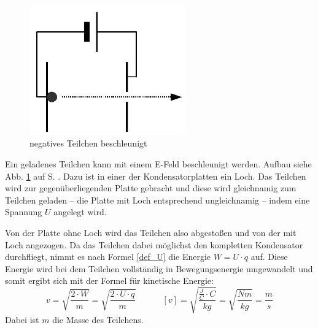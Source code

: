 		\begin{figure}
		\centering
		\includegraphics[width=0.6\textwidth]{mat/beschleunigung}
		\caption{negatives Teilchen beschleunigt}
		\label{img_beschleunigung}
		\end{figure}
Ein geladenes Teilchen kann mit einem E-Feld beschleunigt werden. Aufbau siehe Abb. \ref{img_beschleunigung} auf S. \pageref{img_beschleunigung}. Dazu ist in einer der Kondensatorplatten ein Loch. Das Teilchen wird zur gegenüberliegenden Platte gebracht und diese wird gleichnamig zum Teilchen geladen -- die Platte mit Loch entsprechend ungleichnamig -- indem eine Spannung \(U\) angelegt wird.

Von der Platte ohne Loch wird das Teilchen also abgestoßen und von der mit Loch angezogen. Da das Teilchen dabei möglichst den kompletten Kondensator durchfliegt, nimmt es nach Formel \ref{def_U} die Energie \(W = U \cdot q \) auf. Diese Energie wird bei dem Teilchen vollständig in Bewegungsenergie umgewandelt und somit ergibt sich mit der Formel für kinetische Energie:
	\begin{equation}
	v = \sqrt{\frac{2 \cdot W}{m}} = \sqrt{\frac{2 \cdot U \cdot q}{m}} ~~~~~~~~~~~~~~ [v] = \sqrt{\frac{\frac{J}{C}\cdot C}{kg}} = \sqrt{\frac{Nm}{kg}} = \frac{m}{s}
	\end{equation}
Dabei ist \(m\) die Masse des Teilchens.

